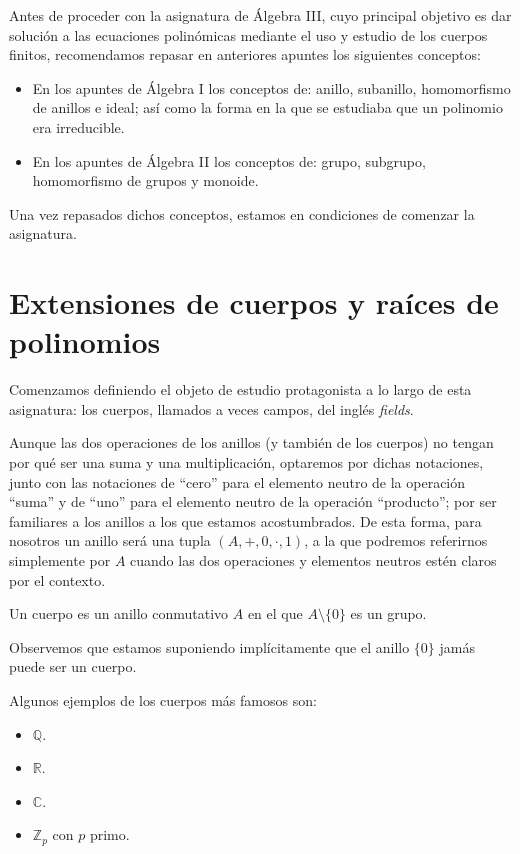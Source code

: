 Antes de proceder con la asignatura de Álgebra III, cuyo principal objetivo es dar solución a las ecuaciones polinómicas mediante el uso y estudio de los cuerpos finitos, recomendamos repasar en anteriores apuntes los siguientes conceptos:
\begin{itemize}
    \item En los apuntes de Álgebra I los conceptos de: anillo, subanillo, homomorfismo de anillos e ideal; así como la forma en la que se estudiaba que un polinomio era irreducible.
    \item En los apuntes de Álgebra II los conceptos de: grupo, subgrupo, homomorfismo de grupos y monoide.
\end{itemize}
Una vez repasados dichos conceptos, estamos en condiciones de comenzar la asignatura.

\chapter{Extensiones de cuerpos y raíces de polinomios}
\noindent
Comenzamos definiendo el objeto de estudio protagonista a lo largo de esta asignatura: los cuerpos, llamados a veces campos, del inglés \textit{fields}.

\begin{notacion}
    Aunque las dos operaciones de los anillos (y también de los cuerpos) no tengan por qué ser una suma y una multiplicación, optaremos por dichas notaciones, junto con las notaciones de ``cero'' para el elemento neutro de la operación ``suma'' y de ``uno'' para el elemento neutro de la operación ``producto''; por ser familiares a los anillos a los que estamos acostumbrados. De esta forma, para nosotros un anillo será una tupla $(A,+,0,\cdot,1)$, a la que podremos referirnos simplemente por $A$ cuando las dos operaciones y elementos neutros estén claros por el contexto.
\end{notacion}

\begin{definicion}[Cuerpo]
    Un cuerpo es un anillo conmutativo $A$ en el que $A\setminus \{0\}$ es un grupo.
\end{definicion}

Observemos que estamos suponiendo implícitamente que el anillo $\{0\}$ jamás puede ser un cuerpo.

\begin{ejemplo}
    Algunos ejemplos de los cuerpos más famosos son:
    \begin{itemize}
        \item $\mathbb{Q}$.
        \item $\mathbb{R}$.
        \item $\mathbb{C}$.
        \item $\mathbb{Z}_p$ con $p$ primo.
    \end{itemize}
\end{ejemplo}

